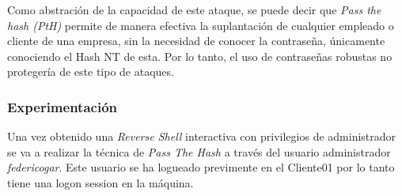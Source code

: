 Como abstración de la capacidad de este ataque, se puede decir que {\it Pass the hash (PtH)} permite de manera efectiva la suplantación de cualquier empleado o cliente de una empresa, sin la necesidad de conocer la contraseña, únicamente conociendo el Hash NT de esta. Por lo tanto, el uso de contraseñas robustas no protegería de este tipo de ataques. \\

\subsubsection{Experimentación}

Una vez obtenido una {\it Reverse Shell} interactiva con privilegios de administrador se va a realizar la técnica de {\it Pass The Hash} a través del usuario administrador {\it federicogar}. Este usuario se ha logueado previmente en el Cliente01 por lo tanto tiene una logon session en la máquina. 

